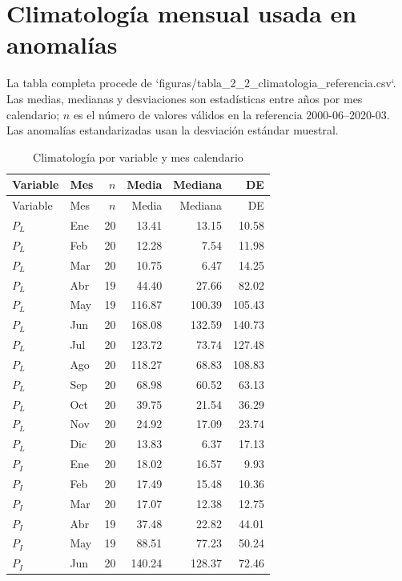 \documentclass[12pt,letterpaper]{article}
\begin{document}
\printbibliography[title={Referencias}]

\appendix
\section{Climatología mensual usada en anomalías}
La tabla completa procede de `figuras/tabla\_2\_2\_climatologia\_referencia.csv`. Las medias, medianas y desviaciones son estadísticas entre años por mes calendario; $n$ es el número de valores válidos en la referencia 2000-06--2020-03. Las anomalías estandarizadas usan la desviación estándar muestral.

\begin{longtable}{llrrrr}
\caption{Climatología por variable y mes calendario}\label{tab:climatologyFull}\\
\toprule
Variable & Mes & $n$ & Media & Mediana & DE \\
\midrule
\endfirsthead
\toprule
Variable & Mes & $n$ & Media & Mediana & DE \\
\midrule
\endhead
\bottomrule
\endfoot
$P_L$ & Ene & 20 & 13.41 & 13.15 & 10.58 \\
$P_L$ & Feb & 20 & 12.28 & 7.54 & 11.98 \\
$P_L$ & Mar & 20 & 10.75 & 6.47 & 14.25 \\
$P_L$ & Abr & 19 & 44.40 & 27.66 & 82.02 \\
$P_L$ & May & 19 & 116.87 & 100.39 & 105.43 \\
$P_L$ & Jun & 20 & 168.08 & 132.59 & 140.73 \\
$P_L$ & Jul & 20 & 123.72 & 73.74 & 127.48 \\
$P_L$ & Ago & 20 & 118.27 & 68.83 & 108.83 \\
$P_L$ & Sep & 20 & 68.98 & 60.52 & 63.13 \\
$P_L$ & Oct & 20 & 39.75 & 21.54 & 36.29 \\
$P_L$ & Nov & 20 & 24.92 & 17.09 & 23.74 \\
$P_L$ & Dic & 20 & 13.83 & 6.37 & 17.13 \\
$P_I$ & Ene & 20 & 18.02 & 16.57 & 9.93 \\
$P_I$ & Feb & 20 & 17.49 & 15.48 & 10.36 \\
$P_I$ & Mar & 20 & 17.07 & 12.38 & 12.75 \\
$P_I$ & Abr & 19 & 37.48 & 22.82 & 44.01 \\
$P_I$ & May & 19 & 88.51 & 77.23 & 50.24 \\
$P_I$ & Jun & 20 & 140.24 & 128.37 & 72.46 \\

\end{longtable}
\end{document}
